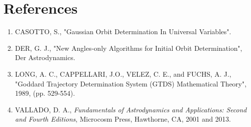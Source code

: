 \documentclass{article}
\begin{document}
	\section{References}
	\begin{enumerate}
	\item CASOTTO, S., "Gaussian Orbit Determination In Universal Variables".
	\item DER, G. J., "New Angles-only Algorithms for Initial Orbit Determination", Der Astrodynamics.
	\item LONG, A. C., CAPPELLARI, J.O., VELEZ, C. E., and FUCHS, A. J., "Goddard Trajectory Determination System (GTDS) Mathematical Theory", 1989, (pp. 529-554).
	\item VALLADO, D. A., \textit{Fundamentals of Astrodynamics and Applications: Second and Fourth Editions}, Microcosm Press, Hawthorne, CA, 2001 and 2013.
	\end{enumerate}
	
	
\end{document}
